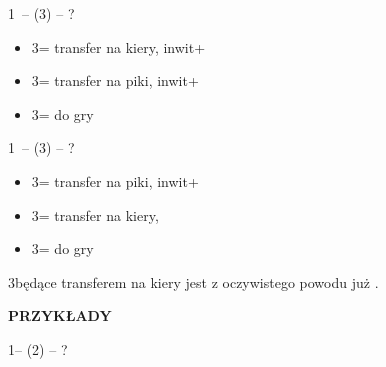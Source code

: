 \documentclass[12pt, a4paper]{article}
\begin{document}
1\nt\ -- (3\clubs) -- ?
\begin{itemize}
    \item 3\diams = transfer na kiery, inwit+
    \item 3\hearts = transfer na piki, inwit+
    \item 3\nt = do gry
\end{itemize}

1\nt\ -- (3\diams) -- ?
\begin{itemize}
    \item 3\hearts = transfer na piki, inwit+
    \item 3\spades = transfer na kiery, \gf \imp
    \item 3\nt = do gry
\end{itemize}

3\spades będące transferem na kiery jest z oczywistego powodu już \gf.

\newpage
\textbf{PRZYKŁADY}

1\nt -- (2\spades) -- ?
\end{document}
